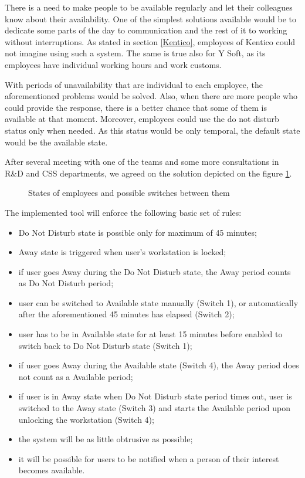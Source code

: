 \documentclass[11pt,singleside]{myfithesis2}
\newcommand{\pict}[4]{
	\begin{figure}[h!]
  		\vspace{-7px}
  		\centerline{\fcolorbox{darkgray}{palegray}{\texttt{[image: \#2]}}}
  		\caption{#1}
  		\label{#4}
	\end{figure}
}
\begin{document}
There is a need to make people to be available regularly and let their colleagues know about their availability. One of the simplest solutions available would be to dedicate some parts of the day to communication and the rest of it to working without interruptions. As stated in section \ref{Kentico}, employees of Kentico could not imagine using such a system. The same is true also for Y Soft, as its employees have individual working hours and work customs. 

With periods of unavailability that are individual to each employee, the aforementioned problems would be solved. Also, when there are more people who could provide the response, there is a better chance that some of them is available at that moment. Moreover, employees could use the do not disturb status only when needed. As this status would be only temporal, the default state would be the available state.

After several meeting with one of the teams and some more consultations in R\&D and CSS departments, we agreed on the solution depicted on the figure \ref{pic:states}.

\pict{States of employees and possible switches between them}{data/States.png}{width=0.8\textwidth}{pic:states}

The implemented tool will enforce the following basic set of rules:
\begin{itemize}
	\item Do Not Disturb state is possible only for maximum of 45 minutes;
	\item Away state is triggered when user's workstation is locked;
	\item if user goes Away during the Do Not Disturb state, the Away period counts as Do Not Disturb period;
	\item user can be switched to Available state manually (Switch 1), or automatically after the aforementioned 45 minutes has elapsed (Switch 2);
	\item user has to be in Available state for at least 15 minutes before enabled to switch back to Do Not Disturb state (Switch 1);
	\item if user goes Away during the Available state (Switch 4), the Away period does not count as a Available period;
	\item if user is in Away state when Do Not Disturb state period times out, user is switched to the Away state (Switch 3) and starts the Available period upon unlocking the workstation (Switch 4);
	\item the system will be as little obtrusive as possible;
	\item it will be possible for users to be notified when a person of their interest becomes available.
\end{itemize}
\end{document}
